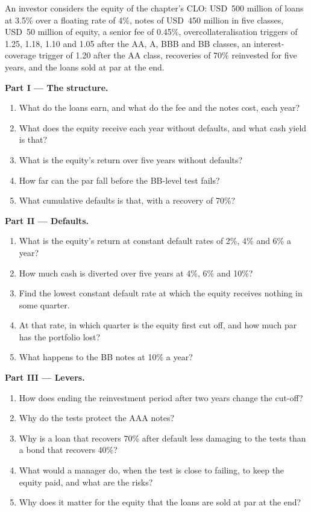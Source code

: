 \begin{problem}\label{pb:m2:loans-clos-and-securitisation:1}
An investor considers the equity of the chapter's CLO: USD~500 million of loans at 3.5\%
over a floating rate of 4\%, notes of USD~450 million in five classes, USD~50 million of
equity, a senior fee of 0.45\%, overcollateralisation triggers of 1.25, 1.18, 1.10 and
1.05 after the AA, A, BBB and BB classes, an interest-coverage trigger of 1.20 after
the AA class, recoveries of 70\% reinvested for five years, and the loans sold at par
at the end.

\medskip\noindent\textbf{Part I --- The structure.}
\begin{enumerate}
\item What do the loans earn, and what do the fee and the notes cost, each year?
\item What does the equity receive each year without defaults, and what cash yield is
that?
\item What is the equity's return over five years without defaults?
\item How far can the par fall before the BB-level test fails?
\item What cumulative defaults is that, with a recovery of 70\%?
\end{enumerate}

\medskip\noindent\textbf{Part II --- Defaults.}
\begin{enumerate}[resume]
\item What is the equity's return at constant default rates of 2\%, 4\% and 6\% a year?
\item How much cash is diverted over five years at 4\%, 6\% and 10\%?
\item Find the lowest constant default rate at which the equity receives nothing in
some quarter.
\item At that rate, in which quarter is the equity first cut off, and how much par has
the portfolio lost?
\item What happens to the BB notes at 10\% a year?
\end{enumerate}

\medskip\noindent\textbf{Part III --- Levers.}
\begin{enumerate}[resume]
\item How does ending the reinvestment period after two years change the cut-off?
\item Why do the tests protect the AAA notes?
\item Why is a loan that recovers 70\% after default less damaging to the tests than a
bond that recovers 40\%?
\item What would a manager do, when the test is close to failing, to keep the equity
paid, and what are the risks?
\item Why does it matter for the equity that the loans are sold at par at the end?
\end{enumerate}


\end{problem}
